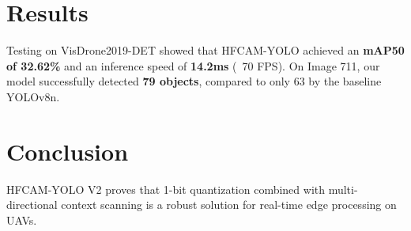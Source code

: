 \documentclass[journal]{IEEEtran}
\begin{document}
\section{Results}
Testing on VisDrone2019-DET showed that HFCAM-YOLO achieved an \textbf{mAP50 of 32.62\%} and an inference speed of \textbf{14.2ms} (~70 FPS). On Image 711, our model successfully detected \textbf{79 objects}, compared to only 63 by the baseline YOLOv8n.

\section{Conclusion}
HFCAM-YOLO V2 proves that 1-bit quantization combined with multi-directional context scanning is a robust solution for real-time edge processing on UAVs.
\end{document}
